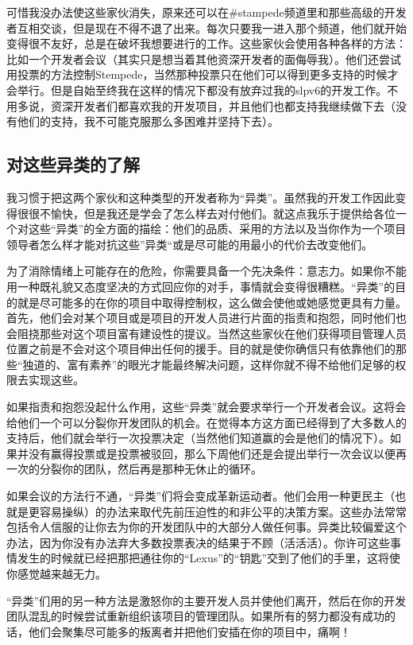 可惜我没办法使这些家伙消失，原来还可以在\#stampede频道里和那些高级的开发者互相交谈，但是现在不得不退了出来。每次只要我一进入那个频道，他们就开始变得很不友好，总是在破坏我想要进行的工作。这些家伙会使用各种各样的方法：比如一个开发者会议（其实只是想当着其他资深开发者的面侮辱我）。他们还尝试用投票的方法控制Stempede，当然那种投票只在他们可以得到更多支持的时候才会举行。但是自始至终我在这样的情况下都没有放弃过我的slpv6的开发工作。不用多说，资深开发者们都喜欢我的开发项目，并且他们也都支持我继续做下去（没有他们的支持，我不可能克服那么多困难并坚持下去）。

\subsection{对这些异类的了解}

我习惯于把这两个家伙和这种类型的开发者称为“异类”。虽然我的开发工作因此变得很很不愉快，但是我还是学会了怎么样去对付他们。就这点我乐于提供给各位一个对这些“异类”的全方面的描绘：他们的品质、采用的方法以及当你作为一个项目领导者怎么样才能对抗这些”异类“或是尽可能的用最小的代价去改变他们。

为了消除情绪上可能存在的危险，你需要具备一个先决条件：意志力。如果你不能用一种既礼貌又态度坚决的方式回应你的对手，事情就会变得很糟糕。“异类”的目的就是尽可能多的在你的项目中取得控制权，这么做会使他或她感觉更具有力量。首先，他们会对某个项目或是项目的开发人员进行片面的指责和抱怨，同时他们也会阻挠那些对这个项目富有建设性的提议。当然这些家伙在他们获得项目管理人员位置之前是不会对这个项目伸出任何的援手。目的就是使你确信只有依靠他们的那些“独道的、富有素养”的眼光才能最终解决问题，这样你就不得不给他们足够的权限去实现这些。

如果指责和抱怨没起什么作用，这些“异类”就会要求举行一个开发者会议。这将会给他们一个可以分裂你开发团队的机会。在觉得本方这方面已经得到了大多数人的支持后，他们就会举行一次投票决定（当然他们知道赢的会是他们的情况下）。如果并没有赢得投票或是投票被驳回，那么下周他们还是会提出举行一次会议以便再一次的分裂你的团队，然后再是那种无休止的循环。

如果会议的方法行不通，“异类”们将会变成革新运动者。他们会用一种更民主（也就是更容易操纵）的办法来取代先前压迫性的和非公平的决策方案。这些办法常常包括令人信服的让你去为你的开发团队中的大部分人做任何事。异类比较偏爱这个办法，因为你没有办法弃大多数投票表决的结果于不顾（活活活）。你许可这些事情发生的时候就已经把那把通往你的“Lexus”的“钥匙”交到了他们的手里，这将使你感觉越来越无力。

“异类”们用的另一种方法是激怒你的主要开发人员并使他们离开，然后在你的开发团队混乱的时候尝试重新组织该项目的管理团队。如果所有的努力都没有成功的话，他们会聚集尽可能多的叛离者并把他们安插在你的项目中，痛啊！

